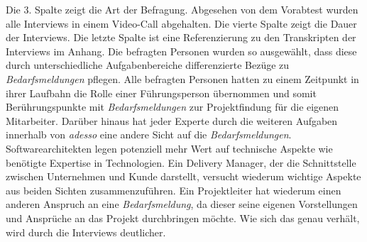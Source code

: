 Die 3. Spalte zeigt die Art der Befragung. Abgesehen von dem Vorabtest wurden alle Interviews in einem Video-Call abgehalten. Die vierte Spalte zeigt die Dauer der Interviews. Die letzte Spalte ist eine Referenzierung zu den Transkripten der Interviews im Anhang. Die befragten Personen wurden so ausgewählt, dass diese durch unterschiedliche Aufgabenbereiche differenzierte Bezüge zu \emph{Bedarfsmeldungen} pflegen. Alle befragten Personen hatten zu einem Zeitpunkt in ihrer Laufbahn die Rolle einer Führungsperson übernommen und somit Berührungspunkte mit \emph{Bedarfsmeldungen} zur Projektfindung für die eigenen Mitarbeiter. Darüber hinaus hat jeder Experte durch die weiteren Aufgaben innerhalb von \emph{adesso} eine andere Sicht auf die \emph{Bedarfsmeldungen}. Softwarearchitekten legen potenziell mehr Wert auf technische Aspekte wie benötigte Expertise in Technologien. Ein Delivery Manager, der die Schnittstelle zwischen Unternehmen und Kunde darstellt, versucht wiederum wichtige Aspekte aus beiden Sichten zusammenzuführen. Ein Projektleiter hat wiederum einen anderen Anspruch an eine \emph{Bedarfsmeldung}, da dieser seine eigenen Vorstellungen und Ansprüche an das Projekt durchbringen möchte. Wie sich das genau verhält, wird durch die Interviews deutlicher.\\

